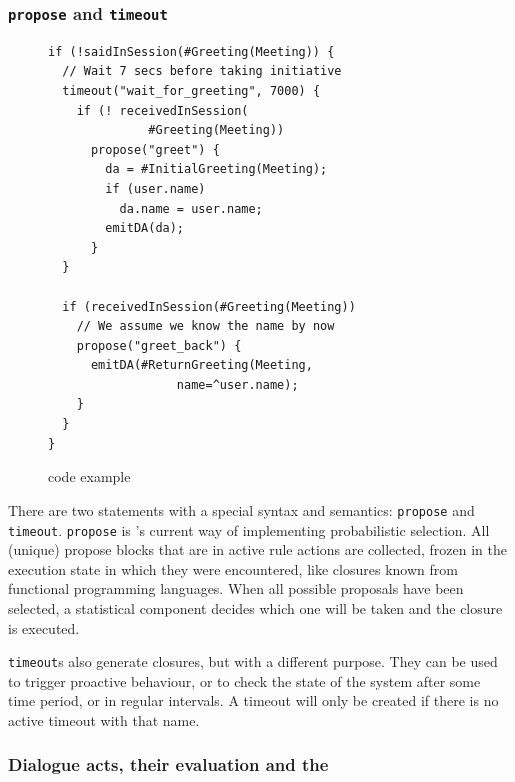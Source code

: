 \subsubsection{\texttt{propose} and \texttt{timeout}}
\begin{figure}[htbp]
  \centering\small%
\begin{verbatim}
if (!saidInSession(#Greeting(Meeting)) {
  // Wait 7 secs before taking initiative
  timeout("wait_for_greeting", 7000) {
    if (! receivedInSession(
              #Greeting(Meeting))
      propose("greet") {
        da = #InitialGreeting(Meeting);
        if (user.name)
          da.name = user.name;
        emitDA(da);
      }
  }

  if (receivedInSession(#Greeting(Meeting))
    // We assume we know the name by now
    propose("greet_back") {
      emitDA(#ReturnGreeting(Meeting,
                  name=^user.name);
    }
  }
}
\end{verbatim}\vspace*{-3ex}
  \caption{\vonda code example}
  \label{fig:propose}
\end{figure}

There are two statements with a special syntax and semantics: \texttt{propose}
and \texttt{timeout}. \texttt{propose} is \vonda's current way of implementing
probabilistic selection. All (unique) propose blocks that are in active rule
actions are collected, frozen in the execution state in which they were
encountered, like closures known from functional programming languages. When
all possible proposals have been selected, a statistical component decides
which one will be taken and the closure is executed.

\texttt{timeout}s also generate closures, but with a different purpose. They
can be used to trigger proactive behaviour, or to check the state of the system
after some time period, or in regular intervals. A timeout will only be created
if there is no active timeout with that name.

\subsubsection{Dialogue acts, their evaluation and the \caret}
\label{sec:caret}


